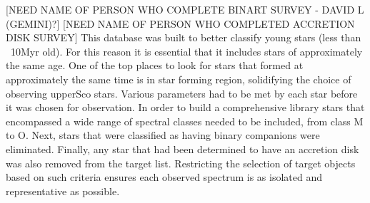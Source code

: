 


[NEED NAME OF PERSON WHO COMPLETE BINART SURVEY - DAVID L (GEMINI)?]
[NEED NAME OF PERSON WHO COMPLETED ACCRETION DISK SURVEY]
This database was built to better classify young stars (less than ~10Myr old).  For this reason it is essential that it includes stars of approximately the same age.  One of the top places to look for stars that formed at approximately the same time is in star forming region, solidifying the choice of observing upperSco stars.  Various parameters had to be met by each star before it was chosen for observation.  In order to build a comprehensive library stars that encompassed a wide range of spectral classes needed to be included, from class M to O.  Next, stars that were classified as having binary companions \cite{binary_guy} were eliminated.  Finally, any star that had been determined to have an accretion disk \cite{disk_guy} was also removed from the target list.  Restricting the selection of target objects based on such criteria ensures each observed spectrum is as isolated and representative as possible. 

